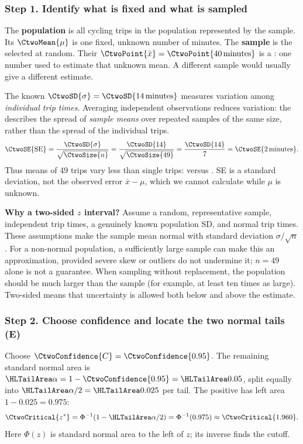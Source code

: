 \subsubsection*{Step 1. Identify what is fixed and what is sampled}
The \textbf{population} is all cycling trips in the population represented by the sample. Its  $\CtwoMean{\mu}$ is one fixed, unknown number
of minutes. The \textbf{sample} is the  selected at random.
Their  $\CtwoPoint{\bar{x}}=\CtwoPoint{40\,\text{minutes}}$
is a : one number used to estimate that unknown mean.
A different sample would usually give a different estimate.

The known 
$\CtwoSD{\sigma}=\CtwoSD{14\,\text{minutes}}$ measures variation among
\emph{individual trip times}. Averaging independent observations reduces variation:
the  describes the spread of \emph{sample means} over
repeated samples of the same size, rather than the spread of the individual trips.
\[
\CtwoSE{\mathrm{SE}}=\frac{\CtwoSD{\sigma}}{\sqrt{\CtwoSize{n}}}
=\frac{\CtwoSD{14}}{\sqrt{\CtwoSize{49}}}
=\frac{\CtwoSD{14}}{7}=\CtwoSE{2\,\text{minutes}}.
\]
Thus means of 49 trips vary less than single trips:  versus
. SE is a standard deviation, not the observed error
$\bar{x}-\mu$, which we cannot calculate while $\mu$ is unknown.

\textbf{Why a two-sided $z$ interval?} Assume a random, representative sample,
independent trip times, a genuinely known population SD, and normal trip times.
These assumptions make the sample mean normal with standard deviation
$\sigma/\sqrt n$. For a non-normal population, a sufficiently large sample can
make this an approximation, provided severe skew or outliers do not undermine it;
$n=49$ alone is not a guarantee. When sampling without replacement, the population
should be much larger than the sample (for example, at least ten times as large).
Two-sided means that uncertainty is allowed both below and above the estimate.

\subsubsection*{Step 2. Choose confidence and locate the two normal tails (E)}
Choose  $\CtwoConfidence{C}=\CtwoConfidence{0.95}$.
The remaining standard normal area is
$\CtwoSignificance{\alpha}=1-\CtwoConfidence{0.95}=\CtwoSignificance{0.05}$,
split equally into $\CtwoSignificance{\alpha/2}=\CtwoSignificance{0.025}$ per tail.
The positive  has left area $1-0.025=0.975$:
\[
\CtwoCritical{z^*}=\Phi^{-1}(1-\CtwoSignificance{\alpha/2})
=\Phi^{-1}(0.975)\approx\CtwoCritical{1.960}.
\]
Here $\Phi(z)$ is standard normal area to the left of $z$; its inverse finds the cutoff.

